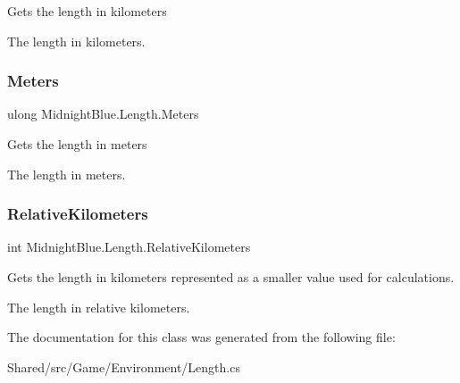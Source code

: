 Gets the length in kilometers 

The length in kilometers.\hypertarget{class_midnight_blue_1_1_length_ac824fa58d75ab754c33cdc8bfd49e5b0}{}\label{class_midnight_blue_1_1_length_ac824fa58d75ab754c33cdc8bfd49e5b0} 
\subsubsection{\texorpdfstring{Meters}{Meters}}
{\footnotesize\ttfamily ulong Midnight\+Blue.\+Length.\+Meters\hspace{0.3cm}{\ttfamily [get]}}



Gets the length in meters 

The length in meters.\hypertarget{class_midnight_blue_1_1_length_a7073632b5e2dfc836266de44378941be}{}\label{class_midnight_blue_1_1_length_a7073632b5e2dfc836266de44378941be} 
\subsubsection{\texorpdfstring{Relative\+Kilometers}{RelativeKilometers}}
{\footnotesize\ttfamily int Midnight\+Blue.\+Length.\+Relative\+Kilometers\hspace{0.3cm}{\ttfamily [get]}}



Gets the length in kilometers represented as a smaller value used for calculations. 

The length in relative kilometers.

The documentation for this class was generated from the following file\+:\begin{DoxyCompactItemize}
\item 
Shared/src/\+Game/\+Environment/Length.\+cs\end{DoxyCompactItemize}
